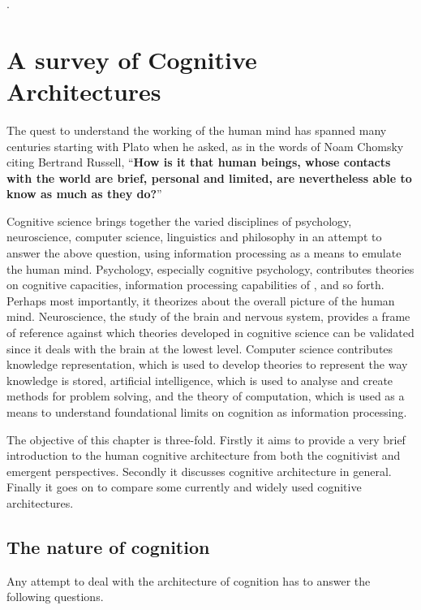 .\chapter{A survey of Cognitive Architectures}
\label{The_nature_of_cognition}
\newcommand{\soar}{\small SOAR\ }
\newcommand{\actr}{\small ACT-R\ }
\newcommand{\epic}{\small EPIC\ }
\newcommand{\clarion}{\small CLARION\ }
The quest to understand the working of the human mind has spanned
many centuries starting with Plato when he asked, as in the words of
Noam Chomsky citing Bertrand Russell, ``{\bf How is it that human beings,
whose contacts with the world are brief, personal and limited, are
nevertheless able to know as much as they do?}'' \cite{Bogdan:1993aa}


Cognitive science brings together the varied disciplines of
psychology, neuroscience, computer science, linguistics and philosophy
in an attempt to answer the above question, using information
processing as a means to emulate the human mind. Psychology,
especially cognitive psychology, contributes theories on cognitive
capacities, information processing capabilities of , and so forth.
Perhaps most importantly, it theorizes about the overall picture of
the human mind. Neuroscience, the study of the brain and nervous
system, provides a frame of reference against which theories developed
in cognitive science can be validated since it deals with the brain at
the lowest level.
% 
%
Computer science contributes knowledge representation, which is used
to develop theories to represent the way knowledge is stored,
artificial intelligence, which is used to analyse and create methods
for problem solving, and the theory of computation, which is used as a
means to understand foundational limits on cognition as
information processing.

The objective of this chapter is three-fold.  Firstly it aims to
provide a very brief introduction to the human cognitive architecture
from both the cognitivist and emergent
\cite{DBLP:journals/tec/VernonMS07} perspectives.  Secondly it
discusses cognitive architecture in general.  Finally it goes on to
compare some currently and widely used cognitive architectures.

\section{The nature of cognition}
\label{nature_Of_Cognition}
Any attempt to deal with the architecture of cognition has to answer
the following questions.

